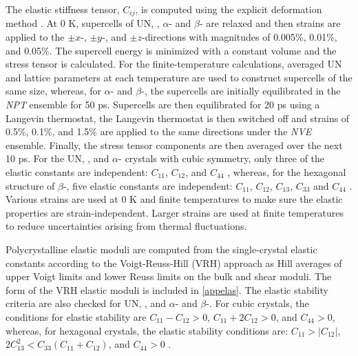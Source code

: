 \documentclass[preprint, 12pt]{elsarticle}
\begin{document}
The elastic stiffness tensor, $C_{ij}$, is computed using the explicit deformation method \cite{Clavier2017}. At 0 K, supercells of UN, , $\alpha$-  and $\beta$- are relaxed and then strains are applied to the $\pm x$-, $\pm y$-, and $ \pm z$-directions with magnitudes of 0.005\%, 0.01\%, and 0.05\%. The supercell energy is minimized with a constant volume and the stress tensor is calculated. For the finite-temperature calculations, averaged UN and  lattice parameters at each temperature are used to construct supercells of the same size, whereas, for $\alpha$- and $\beta$-, the supercells are initially equilibrated in the \textit{NPT} ensemble for 50 ps. Supercells are then equilibrated for 20 ps using a Langevin thermostat, the Langevin thermostat is then switched off and strains of 0.5\%, 0.1\%, and 1.5\% are applied to the same directions under the \textit{NVE} ensemble. Finally, the stress tensor components are then averaged over the next 10 ps. For the UN, , and $\alpha$- crystals with cubic symmetry, only three of the elastic constants are independent: $C_{11}$, $C_{12}$, and $C_{44}$ \cite{Meyers2008}, whereas, for the hexagonal structure of $\beta$-, five elastic constants are independent: $C_{11}$, $C_{12}$, $C_{13}$, $C_{33}$ and $C_{44}$ \cite{Boer2018}. Various strains are used at 0 K and finite temperatures to make sure the elastic properties are strain-independent. Larger strains are used at finite temperatures to reduce uncertainties arising from thermal fluctuations.

Polycrystalline elastic moduli are computed from the single-crystal elastic constants according to the Voigt-Reuss-Hill (VRH) approach \cite{Anderson1963, Meyers2008, Clavier2017} as Hill averages of upper Voigt limits and lower Reuss limits on the bulk and shear moduli. The form of the VRH elastic moduli is included in \ref{appelas}. The elastic stability criteria are also checked for UN, , and $\alpha$- and $\beta$-. For cubic crystals, the conditions for elastic stability are $C_{11} - C_{12} > 0$, $C_{11} + 2 C_{12} > 0$, and $C_{44} > 0$, whereas, for hexagonal crystals, the elastic stability conditions are: $C_{11} > |C_{12}|$, $2C_{13}^2 < C_{33}(C_{11}+C_{12})$, and $C_{44} > 0$ \cite{Mouhat2014}.
\end{document}
